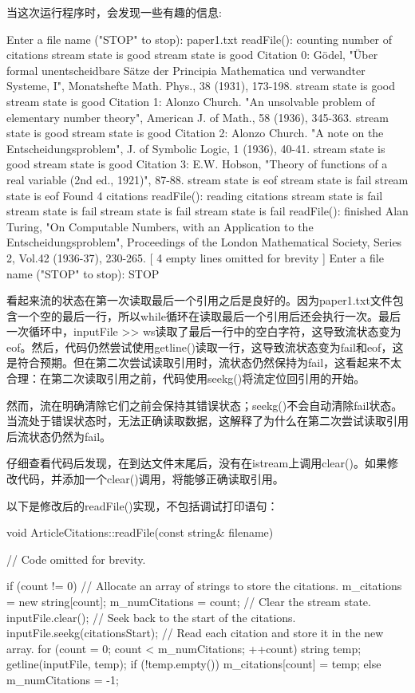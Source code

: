当这次运行程序时，会发现一些有趣的信息:

\begin{shell}
Enter a file name ("STOP" to stop): paper1.txt
readFile(): counting number of citations
stream state is good
stream state is good
Citation 0: Gödel, "Über formal unentscheidbare Sätze der Principia Mathematica und
verwandter Systeme, I", Monatshefte Math. Phys., 38 (1931), 173-198.
stream state is good
stream state is good
Citation 1: Alonzo Church. "An unsolvable problem of elementary number theory",
American J. of Math., 58 (1936), 345-363.
stream state is good
stream state is good
Citation 2: Alonzo Church. "A note on the Entscheidungsproblem", J. of Symbolic
Logic, 1 (1936), 40-41.
stream state is good
stream state is good
Citation 3: E.W. Hobson, "Theory of functions of a real variable (2nd ed.,
1921)", 87-88.
stream state is eof
stream state is fail
stream state is eof
Found 4 citations
readFile(): reading citations
stream state is fail
stream state is fail
stream state is fail
stream state is fail
readFile(): finished
Alan Turing, "On Computable Numbers, with an Application to the
Entscheidungsproblem", Proceedings of the London Mathematical Society, Series 2,
Vol.42 (1936-37), 230-265.
[ 4 empty lines omitted for brevity ]
Enter a file name ("STOP" to stop): STOP
\end{shell}

看起来流的状态在第一次读取最后一个引用之后是良好的。因为paper1.txt文件包含一个空的最后一行，所以while循环在读取最后一个引用后还会执行一次。最后一次循环中，inputFile >{}> ws读取了最后一行中的空白字符，这导致流状态变为eof。然后，代码仍然尝试使用getline()读取一行，这导致流状态变为fail和eof，这是符合预期。但在第二次尝试读取引用时，流状态仍然保持为fail，这看起来不太合理：在第二次读取引用之前，代码使用seekg()将流定位回引用的开始。

然而，流在明确清除它们之前会保持其错误状态；seekg()不会自动清除fail状态。当流处于错误状态时，无法正确读取数据，这解释了为什么在第二次尝试读取引用后流状态仍然为fail。

仔细查看代码后发现，在到达文件末尾后，没有在istream上调用clear()。如果修改代码，并添加一个clear()调用，将能够正确读取引用。

以下是修改后的readFile()实现，不包括调试打印语句：

\begin{cpp}
void ArticleCitations::readFile(const string& filename)
{
    // Code omitted for brevity.

    if (count != 0) {
        // Allocate an array of strings to store the citations.
        m_citations = new string[count];
        m_numCitations = count;
        // Clear the stream state.
        inputFile.clear();
        // Seek back to the start of the citations.
        inputFile.seekg(citationsStart);
        // Read each citation and store it in the new array.
        for (count = 0; count < m_numCitations; ++count) {
            string temp;
            getline(inputFile, temp);
            if (!temp.empty()) {
                m_citations[count] = temp;
            }
        }
    } else {
        m_numCitations = -1;
    }
}
\end{cpp}

